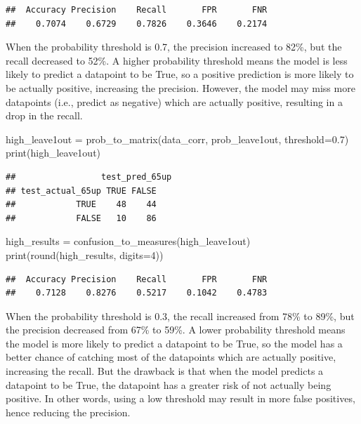 \documentclass[
]{article}
\newenvironment{Shaded}{\begin{snugshade}}{\end{snugshade}}
\newcommand{\AttributeTok}[1]{\textcolor[rgb]{0.77,0.63,0.00}{#1}}
\newcommand{\DecValTok}[1]{\textcolor[rgb]{0.00,0.00,0.81}{#1}}
\newcommand{\FloatTok}[1]{\textcolor[rgb]{0.00,0.00,0.81}{#1}}
\newcommand{\FunctionTok}[1]{\textcolor[rgb]{0.00,0.00,0.00}{#1}}
\newcommand{\NormalTok}[1]{#1}
\newcommand{\OtherTok}[1]{\textcolor[rgb]{0.56,0.35,0.01}{#1}}
\begin{document}
\begin{verbatim}
##  Accuracy Precision    Recall       FPR       FNR 
##    0.7074    0.6729    0.7826    0.3646    0.2174
\end{verbatim}

When the probability threshold is 0.7, the precision increased to 82\%,
but the recall decreased to 52\%. A higher probability threshold means
the model is less likely to predict a datapoint to be True, so a
positive prediction is more likely to be actually positive, increasing
the precision. However, the model may miss more datapoints (i.e.,
predict as negative) which are actually positive, resulting in a drop in
the recall.

\begin{Shaded}
\begin{Highlighting}[]
\NormalTok{high\_leave1out }\OtherTok{=} \FunctionTok{prob\_to\_matrix}\NormalTok{(data\_corr, prob\_leave1out, }\AttributeTok{threshold=}\FloatTok{0.7}\NormalTok{)}
\FunctionTok{print}\NormalTok{(high\_leave1out)}
\end{Highlighting}
\end{Shaded}

\begin{verbatim}
##                 test_pred_65up
## test_actual_65up TRUE FALSE
##            TRUE    48    44
##            FALSE   10    86
\end{verbatim}

\begin{Shaded}
\begin{Highlighting}[]
\NormalTok{high\_results }\OtherTok{=} \FunctionTok{confusion\_to\_measures}\NormalTok{(high\_leave1out)}
\FunctionTok{print}\NormalTok{(}\FunctionTok{round}\NormalTok{(high\_results, }\AttributeTok{digits=}\DecValTok{4}\NormalTok{))}
\end{Highlighting}
\end{Shaded}

\begin{verbatim}
##  Accuracy Precision    Recall       FPR       FNR 
##    0.7128    0.8276    0.5217    0.1042    0.4783
\end{verbatim}

When the probability threshold is 0.3, the recall increased from 78\% to
89\%, but the precision decreased from 67\% to 59\%. A lower probability
threshold means the model is more likely to predict a datapoint to be
True, so the model has a better chance of catching most of the
datapoints which are actually positive, increasing the recall. But the
drawback is that when the model predicts a datapoint to be True, the
datapoint has a greater risk of not actually being positive. In other
words, using a low threshold may result in more false positives, hence
reducing the precision.
\end{document}
